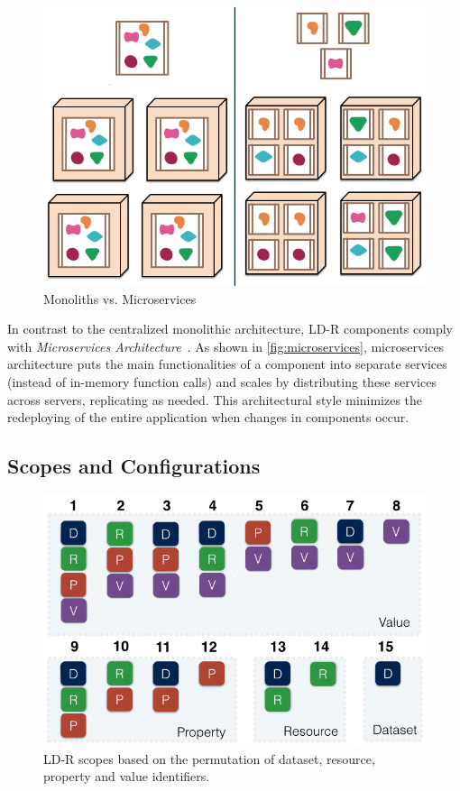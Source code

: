 \documentclass{acm_proc_article-sp}
\begin{document}
\begin{figure}[tb]
  \includegraphics[width=.8\linewidth]{images/microservices.jpg}
  \caption{Monoliths vs. Microservices~\cite{microservices}}
  \label{fig:microservices}
\end{figure}

In contrast to the centralized monolithic architecture, LD-R components comply with \emph{Microservices Architecture}~\cite{microservices}.
As shown in \autoref{fig:microservices}, microservices architecture puts the main functionalities of a component into separate services (instead of in-memory function calls) and scales by distributing these services across servers, replicating as needed.
This architectural style minimizes the redeploying of the entire application when changes in components occur.



\subsection{Scopes and Configurations}

\begin{figure}[tb]
  \includegraphics[width=.9\linewidth]{images/scopes.jpg}
  \caption{LD-R scopes based on the permutation of dataset, resource, property and value identifiers.}
  \label{fig:scopes}
\end{figure}
\end{document}
